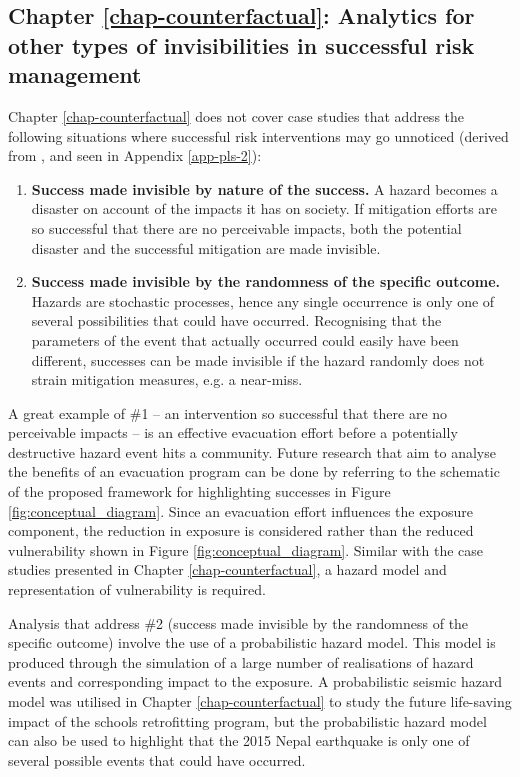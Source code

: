 \subsection{Chapter \ref{chap-counterfactual}: Analytics for other types of invisibilities in successful risk management}

Chapter \ref{chap-counterfactual} does not cover case studies that address the following situations where successful risk interventions may go unnoticed (derived from \citet{lallemant_rabonza_gar_2022}, and seen in Appendix \ref{app-pls-2}):

\begin{enumerate}
    \item \textbf{Success made invisible by nature of the success.} A hazard becomes a disaster on account of the impacts it has on society. If mitigation efforts are so successful that there are no perceivable impacts, both the potential disaster and the successful mitigation are made invisible.

    \item \textbf{Success made invisible by the randomness of the specific outcome.} Hazards are stochastic processes, hence any single occurrence is only one of several possibilities that could have occurred. Recognising that the parameters of the event that actually occurred could easily have been different, successes can be made invisible if the hazard randomly does not strain mitigation measures, e.g. a near-miss.
\end{enumerate}

A great example of \#1 -- an intervention so successful that there are no perceivable impacts -- is an effective evacuation effort before a potentially destructive hazard event hits a community. Future research that aim to analyse the benefits of an evacuation program can be done by referring to the schematic of the proposed framework for highlighting successes in Figure \ref{fig:conceptual_diagram}. Since an evacuation effort influences the exposure component, the reduction in exposure is considered rather than the reduced vulnerability shown in Figure \ref{fig:conceptual_diagram}. Similar with the case studies presented in Chapter \ref{chap-counterfactual}, a hazard model and representation of vulnerability is required.

Analysis that address \#2 (success made invisible by the randomness of the specific outcome) involve the use of a probabilistic hazard model. This model is produced through the simulation of a large number of realisations of hazard events and corresponding impact to the exposure. A probabilistic seismic hazard model was utilised in Chapter \ref{chap-counterfactual} to study the future life-saving impact of the schools retrofitting program, but the probabilistic hazard model can also be used to highlight that the 2015 Nepal earthquake is only one of several possible events that could have occurred.

